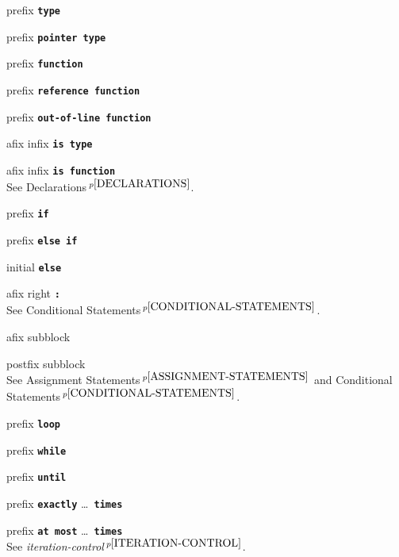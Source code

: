 \documentclass[12pt]{article}
\newcommand{\TT}[1]{{\tt \bfseries #1}}
\newcommand{\pagnote}[1]{$\,^{p\pageref{#1}}$}
\newenvironment{itemlist}[1][1.2in]%
	{\begin{list}{}{\setlength{\labelwidth}{#1}%
		        \setlength{\leftmargin}{\labelwidth}%
		        \addtolength{\leftmargin}{+0.2in}%
		        \renewcommand{\makelabel}[1]{##1\hfill}}}%
	{\end{list}}
\begin{document}
\begin{itemlist}[0.2in]
\item[prefix \TT{type}]
\item[prefix \TT{pointer type}] \vspace*{-0.15in}
\item[prefix \TT{function}] \vspace*{-0.15in}
\item[prefix \TT{reference function}] \vspace*{-0.15in}
\item[prefix \TT{out-of-line function}] \vspace*{-0.15in}
\item[afix infix \TT{is type}] \vspace*{-0.15in}
\item[afix infix \TT{is function}] \vspace*{-0.15in} ~\\
See Declarations\pagnote{DECLARATIONS}.

\item[prefix \TT{if}]
\item[prefix \TT{else if}] \vspace*{-0.15in}
\item[initial \TT{else}] \vspace*{-0.15in}
\item[afix right \TT{:}] \vspace*{-0.15in} ~\\
See Conditional Statements\pagnote{CONDITIONAL-STATEMENTS}.

\item[afix subblock]
\item[postfix subblock] \vspace*{-0.15in} ~\\
See Assignment Statements\pagnote{ASSIGNMENT-STATEMENTS}
and Conditional Statements\pagnote{CONDITIONAL-STATEMENTS}.

\item[prefix \TT{loop}]
\item[prefix \TT{while}] \vspace*{-0.15in}
\item[prefix \TT{until}] \vspace*{-0.15in}
\item[prefix \TT{exactly} \ldots{}~\TT{times}] \vspace*{-0.15in}
\item[prefix \TT{at most} \ldots{}~\TT{times}] \vspace*{-0.15in} ~\\
See {\em iteration-control}\pagnote{ITERATION-CONTROL}.


\end{itemlist}
\end{document}
